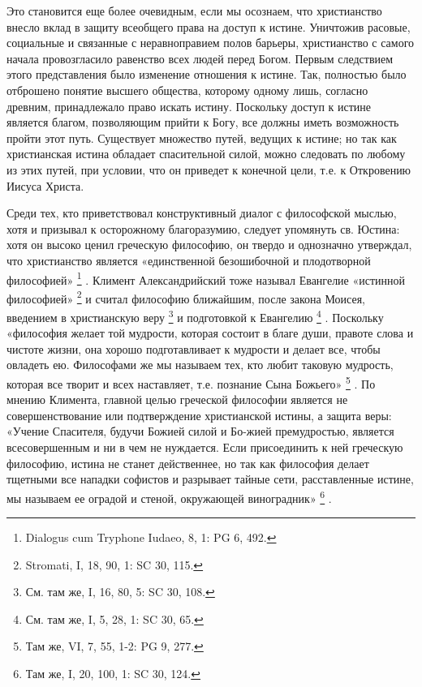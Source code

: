 \documentclass[a5paper,10pt]{article}
\begin{document}
Это становится еще более очевидным, если мы осознаем, что христианство внесло
вклад в защиту всеобщего права на доступ к истине. Уничтожив расовые,
социальные и связанные с неравноправием полов барьеры, христианство с самого
начала провозгласило равенство всех людей перед Богом. Первым следствием этого
представления было изменение отношения к истине. Так, полностью было отброшено
понятие высшего общества, которому одному лишь, согласно древним, принадлежало
право искать истину. Поскольку доступ к истине является благом, позволяющим
прийти к Богу, все должны иметь возможность пройти этот путь. Существует
множество путей, ведущих к истине; но так как христианская истина обладает
спасительной силой, можно следовать по любому из этих путей, при условии, что
он приведет к конечной цели, т.е. к Откровению Иисуса Христа.

Среди тех, кто приветствовал конструктивный диалог с философской мыслью, хотя и
призывал к осторожному благоразумию, следует упомянуть св. Юстина: хотя он
высоко ценил греческую философию, он твердо и однозначно утверждал, что
христианство является «единственной безошибочной и плодотворной философией»
\footnote{Dialogus cum Tryphone Iudaeo, 8, 1: PG 6, 492.}  .  Климент
Александрийский тоже называл Евангелие «истинной философией»
\footnote{Stromati, I, 18, 90, 1: SC 30, 115.}  и считал философию ближайшим,
после закона Моисея, введением в христианскую веру \footnote{См. там же, I, 16,
80, 5: SC 30, 108.}  и подготовкой к Евангелию \footnote{См. там же, I, 5, 28,
1: SC 30, 65.}  . Поскольку «философия желает той мудрости, которая состоит в
благе души, правоте слова и чистоте жизни, она хорошо подготавливает к мудрости
и делает все, чтобы овладеть ею. Философами же мы называем тех, кто любит
таковую мудрость, которая все творит и всех наставляет, т.е. познание Сына
Божьего» \footnote{Там же, VI, 7, 55, 1-2: PG 9, 277.} .  По мнению Климента,
главной целью греческой философии является не совершенствование или
подтверждение христианской истины, а защита веры: «Учение Спасителя, будучи
Божией силой и Бо-жией премудростью, является всесовершенным и ни в чем не
нуждается. Если присоединить к ней греческую философию, истина не станет
действеннее, но так как философия делает тщетными все нападки софистов и
разрывает тайные сети, расставленные истине, мы называем ее оградой и стеной,
окружающей виноградник» \footnote{Там же, I, 20, 100, 1: SC 30, 124.} .
\end{document}
